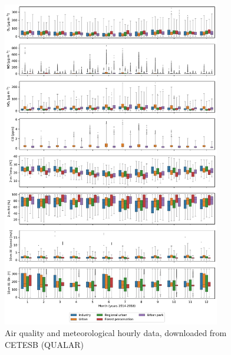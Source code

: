 	\begin{figure}[!ht]
		\centering
 		\includegraphics[width=0.85\textwidth]{fig/Air_Met_boxplot.pdf}
  		\caption{Air quality and meteorological hourly data, downloaded from CETESB (QUALAR)}
  		\label{fig:Data}
	\end{figure}
	
